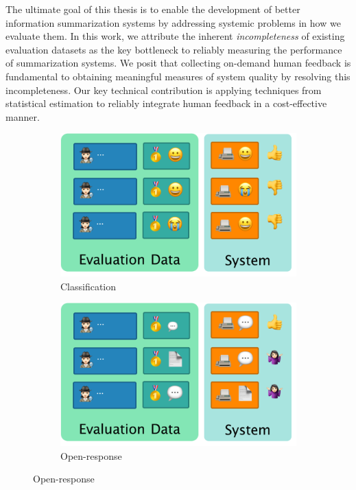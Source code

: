 The ultimate goal of this thesis is to enable the development of better information summarization systems by addressing systemic problems in how we evaluate them.
In this work, we attribute the inherent \textit{incompleteness} of existing evaluation datasets as the key bottleneck to reliably measuring the performance of summarization systems.
We posit that collecting on-demand human feedback is fundamental to obtaining meaningful measures of system quality by resolving this incompleteness.
Our key technical contribution is applying techniques from statistical estimation to reliably integrate human feedback in a cost-effective manner.

\begin{figure}
  \hfill
  \begin{subfigure}{0.45\textwidth}
  \includegraphics[width=\textwidth]{figures/classification}
  \caption{Classification}
  \end{subfigure} 
  \hfill
  \begin{subfigure}{0.45\textwidth}
  \includegraphics[width=\textwidth]{figures/generation}
  \caption{Open-response}
  \end{subfigure}
  \hfill


\end{figure}
